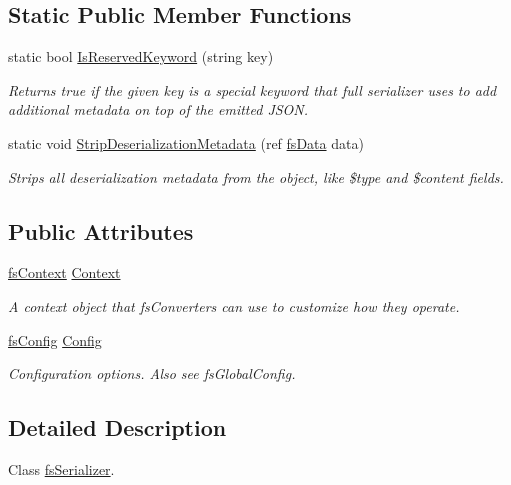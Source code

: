 \subsection*{Static Public Member Functions}
\begin{DoxyCompactItemize}
\item 
static bool \hyperlink{class_full_serializer_1_1fs_serializer_a720cc782d2299ee7a1050905d224a12c}{Is\+Reserved\+Keyword} (string key)
\begin{DoxyCompactList}\small\item\em Returns true if the given key is a special keyword that full serializer uses to add additional metadata on top of the emitted J\+S\+ON. \end{DoxyCompactList}\item 
static void \hyperlink{class_full_serializer_1_1fs_serializer_a9adc1e64a01745e7cad713f39dc27630}{Strip\+Deserialization\+Metadata} (ref \hyperlink{class_full_serializer_1_1fs_data}{fs\+Data} data)
\begin{DoxyCompactList}\small\item\em Strips all deserialization metadata from the object, like \$type and \$content fields. \end{DoxyCompactList}\end{DoxyCompactItemize}
\subsection*{Public Attributes}
\begin{DoxyCompactItemize}
\item 
\hyperlink{class_full_serializer_1_1fs_context}{fs\+Context} \hyperlink{class_full_serializer_1_1fs_serializer_a19a1520594532d7d8bcbcf4f1dac557f}{Context}
\begin{DoxyCompactList}\small\item\em A context object that fs\+Converters can use to customize how they operate. \end{DoxyCompactList}\item 
\hyperlink{class_full_serializer_1_1fs_config}{fs\+Config} \hyperlink{class_full_serializer_1_1fs_serializer_a2cf05f098caf0bf67427114d20abb0ca}{Config}
\begin{DoxyCompactList}\small\item\em Configuration options. Also see fs\+Global\+Config. \end{DoxyCompactList}\end{DoxyCompactItemize}


\subsection{Detailed Description}
Class \hyperlink{class_full_serializer_1_1fs_serializer}{fs\+Serializer}. 



